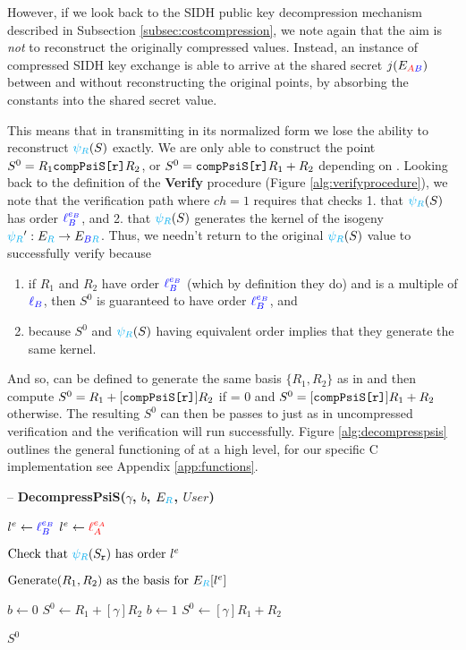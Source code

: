 However, if we look back to the SIDH public key decompression mechanism described in Subsection \ref{subsec:costcompression}, we note again that the aim is \textit{not} to reconstruct the originally compressed values. Instead, an instance of compressed SIDH key exchange is able to arrive at the shared secret $j(E_{\textcolor{red}{A}\textcolor{blue}{B}})$ between \alice and \bob without reconstructing the original points, by absorbing the constants into the shared secret value.

This means that in transmitting  in its normalized form we lose the ability to reconstruct $\textcolor{cyan}{\psi_R}(S)$ exactly. We are only able to construct the point $S^{0} = R_1 \texttt{compPsiS[r]}R_2$, or $S^{0} = \texttt{compPsiS[r]}R_1 + R_2$ depending on . Looking back to the definition of the \textbf{Verify} procedure (Figure \ref{alg:verifyprocedure}), we note that the verification path where $ch = 1$ requires that \alice checks 1. that $\textcolor{cyan}{\psi_R}(S)$ has order $\textcolor{blue}{\ell_{B}^{e_B}}$, and 2. that $\textcolor{cyan}{\psi_R}(S)$ generates the kernel of the isogeny $\textcolor{cyan}{\psi_R}' : E_{\textcolor{cyan}{R}} \rightarrow E_{\textcolor{blue}{B}\textcolor{cyan}{R}}$. Thus, we needn't return to the original $\textcolor{cyan}{\psi_R}(S)$ value to successfully verify because
\begin{enumerate}
\item if $R_1$ and $R_2$ have order $\textcolor{blue}{\ell_{B}^{e_B}}$ (which by definition they do) and  is a multiple of $\textcolor{blue}{\ell_{B}}$, then $S^{0}$ is guaranteed to have order $\textcolor{blue}{\ell_{B}^{e_B}}$, and
\item because $S^{0}$ and $\textcolor{cyan}{\psi_R}(S)$ having equivalent order implies that they generate the same kernel.
\end{enumerate}

And so,  can be defined to generate the same basis $\{R_1, R_2\}$ as in  and then compute $S^{0} = R_1 + [\texttt{compPsiS[r]}]R_2$ if  = 0 and $S^{0} = [\texttt{compPsiS[r]}]R_1 + R_2$ otherwise. The resulting $S^{0}$ can then be passes to   just as in uncompressed verification and the verification will run successfully. Figure \ref{alg:decompresspsis} outlines the general functioning of  at a high level, for our specific C implementation see Appendix \ref{app:functions}.

\begin{algorithm}
\caption{-- \textbf{DecompressPsiS($\gamma$, $b$, $E_{\textcolor{cyan}{R}}$, $User$)}}
\label{alg:decompresspsis}
\begin{algorithmic}[1]
	\State $l^e \gets \textcolor{blue}{\ell_{B}^{e_B}}$ 
\EndIf
{}
	\State $l^e \gets \textcolor{red}{\ell_{A}^{e_A}}$
\EndIf

\State $\text{Check that } \textcolor{cyan}{\psi_R}(S_{\texttt{r}}) \text{ has order } l^e$

\State $\text{Generate} (R_{1}, R_{2}) \text{ as the basis for } E_{\textcolor{cyan}{R}}[l^e]$

	\State $b \gets 0$
	\State $S^{0} \gets R_1 + [\gamma]R_2$
\Else
	\State $b \gets 1$
	\State $S^{0} \gets [\gamma]R_1 + R_2$
\EndIf

\State \Return $S^{0}$
\end{algorithmic}
\end{algorithm}

